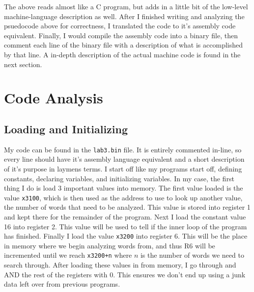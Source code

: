 \documentclass[a4paper,11pt]{article}
\begin{document}
 The above reads almost like a C program, but adds in a little bit of the low-level machine-language description as well. After I finished writing and analyzing the psuedocode above for correctness, I translated the code to it's assembly code equivalent. Finally, I would compile the assembly code into a binary file, then comment each line of the binary file with a description of what is accomplished by that line. A in-depth description of the actual machine code is found in the next section.


\section{Code Analysis}

\subsection{Loading and Initializing}
My code can be found in the \texttt{lab3.bin} file. It is entirely commented in-line, so every line should have it's assembly language equivalent and a short description of it's purpose in laymens terms. I start off like my programs start off, defining constants, declaring variables, and initializing variables. In my case, the first thing I do is load 3 important values into memory. The first value loaded is the value \texttt{x3100}, which is then used as the address to use to look up another value, the number of words that need to be analyzed. This value is stored into register 1 and kept there for the remainder of the program. Next I load the constant value 16 into register 2. This value will be used to tell if the inner loop of the program has finished. Finally I load the value \texttt{x3200} into register 6. This will be the place in memory where we begin analyzing words from, and thus R6 will be incremented until we reach \texttt{x3200+n} where $n$ is the number of words we need to search through. After loading these values in from memory, I go through and AND the rest of the registers with 0. This ensures we don't end up using a junk data left over from previous programs.
\end{document}
